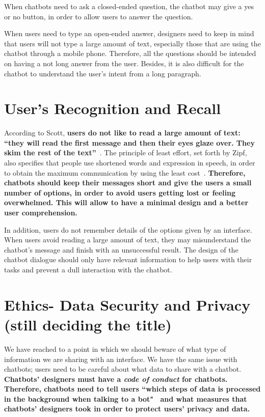 \documentclass[a4paper,10pt]{article}
\begin{document}
When chatbots need to ask a closed-ended question, the chatbot may give a yes or no button, in order to allow users to answer the question. 

When users need to type an open-ended answer, designers need to keep in mind that users will not type a large amount of text, especially those that are using the chatbot through a mobile phone. Therefore, all the questions should be intended on having a not long answer from the user. Besides, it is also difficult for the chatbot to understand the user's intent from a long paragraph. 

 
\section{User's Recognition and Recall}

According to Scott, \textbf{users do not like to read a large amount of text: ``they will read the first message and then their eyes glaze over. They skim the rest of the text”}~\cite{HeuristicsWebPage}. The principle of least effort, set forth by Zipf, also specifies that people use shortened words and expression in speech, in order to obtain the maximum communication by using the least cost~\cite{zipf2016human}. \textbf{Therefore, chatbots should keep their messages short and give the users a small number of options, in order to avoid users getting lost or feeling overwhelmed. This will allow to have a minimal design and a better user comprehension.}

In addition, users do not remember details of the options given by an interface. When users avoid reading a large amount of text, they may misunderstand the chatbot’s message and finish with an unsuccessful result. The design of the chatbot dialogue should only have relevant information to help users with their tasks and prevent a dull interaction with the chatbot. 
\section{Ethics- Data Security and Privacy (still deciding the title)}
We have reached to a point in which we should beware of what type of information we are sharing with an interface. We have the same issue with chatbots; users need to be careful about what data to share with a chatbot. \textbf{Chatbots' designers must have a \textit{code of conduct} for chatbots. Therefore, chatbots need to tell users ``which steps of data is processed in the background when talking to a bot"~\cite{PrivacyandDataSecurityofChatbots} and what measures that chatbots' designers took in order to protect users' privacy and data.} 
\end{document}
